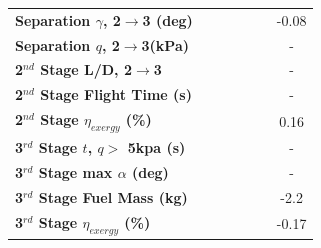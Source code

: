 \begin{table}[ht!]
\begin{tabular}{l c c c c c c}
		\\
		\textbf{Separation $\gamma$, 2$\rightarrow$3 (deg)}
		& \secondthirdSeparationgammaIspNinetyNoReturn
		& \secondthirdSeparationgammaIspNinetyFiveNoReturn
		& \secondthirdSeparationgammaIspStandardNoReturn
		& \secondthirdSeparationgammaIspOneHundredFiveNoReturn
		& \secondthirdSeparationgammaIspOneHundredTenNoReturn
		&-0.08
		\\
		\textbf{Separation $q$, 2$\rightarrow$3(kPa)}
		& \secondthirdSeparationqIspNinetyNoReturn
		& \secondthirdSeparationqIspNinetyFiveNoReturn
		& \secondthirdSeparationqIspStandardNoReturn
		& \secondthirdSeparationqIspOneHundredFiveNoReturn
		& \secondthirdSeparationqIspOneHundredTenNoReturn
		& -
		\\
		\textbf{2$^{nd}$ Stage L/D, 2$\rightarrow$3}
		& \secondthirdSeparationLDIspNinetyNoReturn
		& \secondthirdSeparationLDIspNinetyFiveNoReturn
		& \secondthirdSeparationLDIspStandardNoReturn
		& \secondthirdSeparationLDIspOneHundredFiveNoReturn
		& \secondthirdSeparationLDIspOneHundredTenNoReturn
		& -
		\\
		\textbf{2$^{nd}$ Stage Flight Time (s)}
		& \secondFlightTimeIspNinetyNoReturn
		& \secondFlightTimeIspNinetyFiveNoReturn
		& \secondFlightTimeIspStandardNoReturn
		& \secondFlightTimeIspOneHundredFiveNoReturn
		& \secondFlightTimeIspOneHundredTenNoReturn
		& -
		\\
		\textbf{2$^{nd}$ Stage $\eta_{exergy}$ (\%)}
		& \secondExergyEffIspNinetyNoReturn
		& \secondExergyEffIspNinetyFiveNoReturn
		& \secondExergyEffIspStandardNoReturn
		& \secondExergyEffIspOneHundredFiveNoReturn
		& \secondExergyEffIspOneHundredTenNoReturn
		&0.16
		\\
		\textbf{3$^{rd}$ Stage $t$, $q >$ 5kpa (s)}
		& \thirdqOverFiveIspNinetyNoReturn
		& \thirdqOverFiveIspNinetyFiveNoReturn
		& \thirdqOverFiveIspStandardNoReturn
		& \thirdqOverFiveIspOneHundredFiveNoReturn
		& \thirdqOverFiveIspOneHundredTenNoReturn
		& -
		\\
		\textbf{3$^{rd}$ Stage max $\alpha$ (deg)}
		& \thirdmaxAoAIspNinetyNoReturn
		& \thirdmaxAoAIspNinetyFiveNoReturn
		& \thirdmaxAoAIspStandardNoReturn
		& \thirdmaxAoAIspOneHundredFiveNoReturn
		& \thirdmaxAoAIspOneHundredTenNoReturn
		& -
		\\
		\textbf{3$^{rd}$ Stage Fuel Mass (kg)}
		& \thirdmFuelIspNinetyNoReturn
		& \thirdmFuelIspNinetyFiveNoReturn
		& \thirdmFuelIspStandardNoReturn
		& \thirdmFuelIspOneHundredFiveNoReturn
		& \thirdmFuelIspOneHundredTenNoReturn
		&-2.2
		\\
		\textbf{3$^{rd}$ Stage $\eta_{exergy}$ (\%)}
		& \thirddExergyEffIspNinetyNoReturn
		& \thirddExergyEffIspNinetyFiveNoReturn
		& \thirddExergyEffIspStandardNoReturn
		& \thirddExergyEffIspOneHundredFiveNoReturn
		& \thirddExergyEffIspOneHundredTenNoReturn
		&-0.17
		\\
		\hline 
	\end{tabular} 
	
\end{table}

